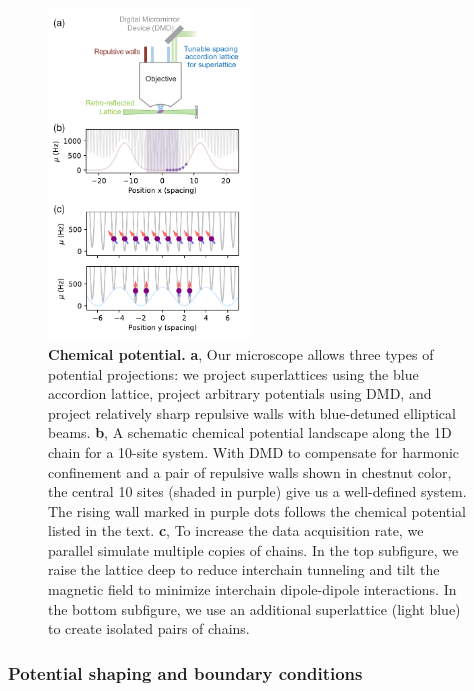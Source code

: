 \documentclass[preprint,superscriptaddress,floatfix, nofootinbib]{revtex4-2}
\begin{document}
\begin{figure}
    \centering
    \includegraphics[width=0.48\textwidth]{figures/chemical_potential.pdf}
    \caption{\textbf{Chemical potential.} \textbf{a}, Our microscope allows three types of potential projections: we project superlattices using the blue accordion lattice, project arbitrary potentials using DMD, and project relatively sharp repulsive walls with blue-detuned elliptical beams. \textbf{b}, A schematic chemical potential landscape along the 1D chain for a 10-site system. With DMD to compensate for harmonic confinement and a pair of repulsive walls shown in chestnut color, the central 10 sites (shaded in purple) give us a well-defined system. The rising wall marked in purple dots follows the chemical potential listed in the text. \textbf{c}, To increase the data acquisition rate, we parallel simulate multiple copies of chains. In the top subfigure, we raise the lattice deep to reduce interchain tunneling and tilt the magnetic field to minimize interchain dipole-dipole interactions. In the bottom subfigure, we use an additional superlattice (light blue) to create isolated pairs of chains.
    }
    \label{fig: chemical_potential}
\end{figure}

\subsubsection*{Potential shaping and boundary conditions}
\end{document}
